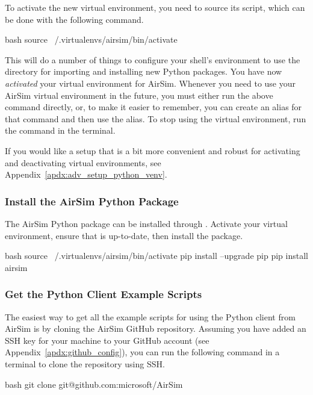 To activate the new virtual environment, you need to source its  script, which can be done with the following command.
\begin{minttcb}{bash}
    source ~/.virtualenvs/airsim/bin/activate
\end{minttcb}
This will do a number of things to configure your shell's environment to use the  directory for importing and installing new Python packages. You have now \textit{activated} your virtual environment for AirSim. Whenever you need to use your AirSim virtual environment in the future, you must either run the above command directly, or, to make it easier to remember, you can create an alias for that command and then use the alias. To stop using the virtual environment, run the command  in the terminal.

If you would like a setup that is a bit more convenient and robust for activating and deactivating virtual environments, see Appendix~\ref{apdx:adv_setup_python_venv}.

\subsubsection{Install the AirSim Python Package}
The AirSim Python package can be installed through . Activate your virtual environment, ensure that  is up-to-date, then install the  package.
\begin{minttcb}{bash}
    source ~/.virtualenvs/airsim/bin/activate
    pip install --upgrade pip
    pip install airsim
\end{minttcb}

\subsubsection{Get the Python Client Example Scripts}
The easiest way to get all the example scripts for using the Python client from AirSim is by cloning the AirSim GitHub repository. Assuming you have added an SSH key for your machine to your GitHub account (see Appendix~\ref{apdx:github_config}), you can run the following command in a terminal to clone the repository using SSH.
\begin{minttcb}{bash}
    git clone git@github.com:microsoft/AirSim
\end{minttcb}

